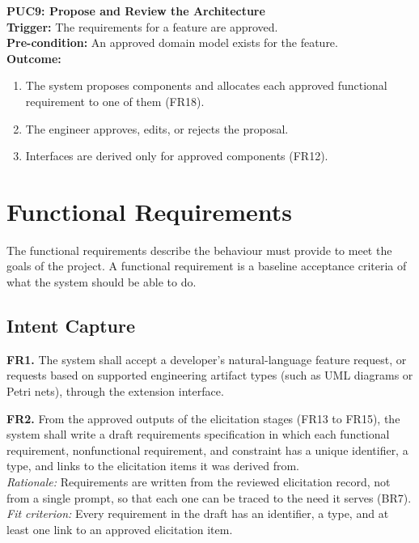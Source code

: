 \documentclass[12pt]{article}
\begin{document}
\noindent\textbf{PUC9: Propose and Review the Architecture}\\
\textbf{Trigger:} The requirements for a feature are approved.\\
\textbf{Pre-condition:} An approved domain model exists for the feature.\\
\textbf{Outcome:}
\begin{enumerate}
    \item The system proposes components and allocates each approved functional requirement to one of them (FR18).
    \item The engineer approves, edits, or rejects the proposal.
    \item Interfaces are derived only for approved components (FR12).
\end{enumerate}

\section{Functional Requirements}

The functional requirements describe the behaviour \progname{} must provide to
meet the goals of the project.
 A functional requirement is a baseline acceptance criteria of what the system should be able to do. 

\subsection{Intent Capture}

\medskip
\noindent\textbf{FR1.} The system shall accept a developer's natural-language
feature request, or requests based on supported engineering artifact types
(such as UML diagrams or Petri nets), through the \progname{} extension interface.

\medskip
\noindent\textbf{FR2.} From the approved outputs of the elicitation stages (FR13 to
FR15), the system shall write a draft requirements specification in which each
functional requirement, nonfunctional requirement, and constraint has a unique
identifier, a type, and links to the elicitation items it was derived from.\\
\textit{Rationale:} Requirements are written from the reviewed elicitation
record, not from a single prompt, so that each one can be traced to the need it
serves (BR7).\\
\textit{Fit criterion:} Every requirement in the draft has an identifier, a
type, and at least one link to an approved elicitation item.
\end{document}
